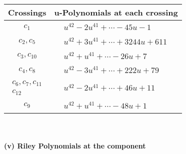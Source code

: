 \documentclass[1p]{elsarticle_modified}
\theoremstyle{definition}
\begin{document}
\begin{tabular}{m{50pt}|m{274pt}}
Crossings & \hspace{64pt}u-Polynomials at each crossing \\
\hline $$\begin{aligned}c_{1}\end{aligned}$$&$\begin{aligned}
&u^{42}-2 u^{41}+\cdots-45 u-1
\end{aligned}$\\
\hline $$\begin{aligned}c_{2},c_{5}\end{aligned}$$&$\begin{aligned}
&u^{42}+3 u^{41}+\cdots+3244 u+611
\end{aligned}$\\
\hline $$\begin{aligned}c_{3},c_{10}\end{aligned}$$&$\begin{aligned}
&u^{42}+u^{41}+\cdots-26 u+7
\end{aligned}$\\
\hline $$\begin{aligned}c_{4},c_{8}\end{aligned}$$&$\begin{aligned}
&u^{42}-3 u^{41}+\cdots+222 u+79
\end{aligned}$\\
\hline $$\begin{aligned}c_{6},c_{7},c_{11}\\c_{12}\end{aligned}$$&$\begin{aligned}
&u^{42}-2 u^{41}+\cdots+46 u+11
\end{aligned}$\\
\hline $$\begin{aligned}c_{9}\end{aligned}$$&$\begin{aligned}
&u^{42}+u^{41}+\cdots-48 u+1
\end{aligned}$\\
\hline
\end{tabular}\\~\\
\newpage\renewcommand{\arraystretch}{1}
\flushleft \textbf{(v) Riley Polynomials at the component}\newline \\
\end{document}
